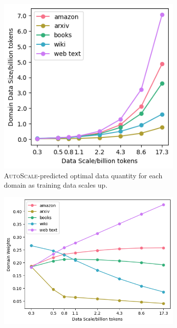 \documentclass{article} %
\begin{document}
\begin{appendices}{}
\begin{figure}[h!]
    \centering
    \begin{subfigure}[b]{0.4\textwidth}
        \includegraphics[width=\textwidth]{bertfigs/bertdata.png}
        \caption{\textsc{AutoScale}-predicted optimal data quantity for each domain as training data scales up.}
    \end{subfigure}
    \hspace{1em}
    \begin{subfigure}[b]{0.51\textwidth}
        \includegraphics[width=\textwidth]{bertfigs/bertas.png}

\end{subfigure}
\end{figure}
\end{appendices}
\end{document}
